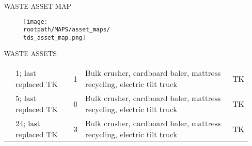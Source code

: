 \textcolor{ccorange}{WASTE ASSET MAP}
\begin{figure}[H]
\raggedright
\texttt{[image: \\rootpath/MAPS/asset\_maps/\\tds\_asset\_map.png]}
\end{figure}
\pagebreak

\textcolor{ccorange}{WASTE ASSETS}

\begin{table}[H]
\small
\begin{tabular}{V{.25\columnwidth}|V{.15\columnwidth}|V{.15\columnwidth}|V{.25\columnwidth}|V{.15\columnwidth}|}
                                                                                              &  &  &    &  \\ \hline
{}        & 1; last replaced TK                                                & 1                                                                  & Bulk crusher, cardboard baler, mattress recycling, electric tilt truck & TK                                                            \\ \hline
{} & 5; last replaced TK                                                & 0                                                                  & Bulk crusher, cardboard baler, mattress recycling, electric tilt truck & TK                                                            \\ \hline
{}            & 24; last replaced TK                                               & 3                                                                  & Bulk crusher, cardboard baler, mattress recycling, electric tilt truck & TK                                                            \\ \hline
\end{tabular}
\end{table}

